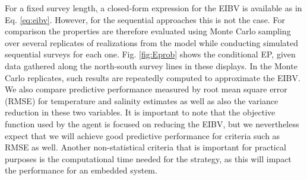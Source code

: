 \documentclass[aoas]{imsart}
\begin{document}
For a fixed survey length, a closed-form expression for the EIBV is
available as in Eq. \eqref{eq:eibv}. However, for the sequential
approaches this is not the case. For comparison the properties are
therefore evaluated using Monte Carlo sampling over several replicates
of realizations from the model while conducting simulated sequential
surveys for each one. Fig. \ref{fig:Eprob} shows the conditional EP,
given data gathered along the north-south survey lines in these
displays. In the Monte Carlo replicates, such results are repeatedly
computed to approximate the EIBV. We also compare predictive
performance measured by root mean square error (RMSE) for temperature
and salinity estimates as well as also the variance reduction in these
two variables. It is important to note that the objective function
used by the agent  is focused on reducing the
EIBV, but we nevertheless expect that we will achieve good predictive
performance for criteria such as RMSE as well. Another non-statistical
criteria that is important for practical purposes is the computational
time needed for the strategy, as this will impact the performance for
an embedded system.

\end{document}
